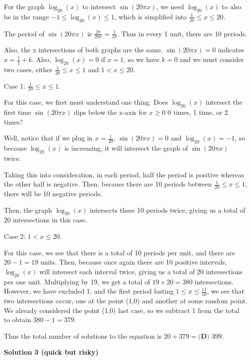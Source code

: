 \begin{enumerate}
 For the graph $\log_{20}(x)$ to intersect $\sin(20\pi x)$, we need $\log_{20}(x)$ to also be in the range $-1 \le \log_{20}(x) \le 1$, which is simplified into $\frac{1}{20} \le x \le 20$.

 The period of $\sin(20\pi x)$ is $\frac{2\pi}{20\pi} = \frac{1}{10}$. Thus in every 1 unit, there are 10 periods.

 Also, the x intersections of both graphs are the same. $\sin(20\pi x) = 0$ indicates $x = \frac{1}{2} + k$. Also, $\log_{20}(x) = 0$ if $x = 1$, so we have $k = 0$ and we must consider two cases, either $\frac{1}{20} \le x \le 1$ and $1 < x \le 20$.

 Case 1: $\frac{1}{20} \le x \le 1$.

 For this case, we first must understand one thing. Does $\log_{20}(x)$ intersect the first time $\sin(20\pi x)$ dips below the x-axis for $x \ge 0$ 0 times, 1 time, or 2 times?

 Well, notice that if we plug in $x = \frac{1}{20}$, $\sin(20\pi x) = 0$ and $\log_{20}(x) = -1$, so because $\log_{20}(x)$ is increasing, it will intersect the graph of $\sin(20\pi x)$ twice.

 Taking this into consideration, in each period, half the period is positive whereas the other half is negative. Then, because there are 10 periods between $\frac{1}{20} \le x \le 1$, there will be 10 negative periods.

 Then, the graph $\log_{20}(x)$ intersects these 10 periods twice, giving us a total of 20 intersections in this case.

 Case 2: $1 < x \le 20$.

 For this case, we see that there is a total of 10 periods per unit, and there are $20 - 1 = 19$ units. Then, because once again there are 10 positive intervals, $\log_{20}(x)$ will intersect each interval twice, giving us a total of 20 intersections per one unit. Multiplying by 19, we get a total of $19 \times 20 = 380$ intersections. However, we have excluded 1, and the first period lasting $1 \le x \le \frac{11}{10}$, we see that two intersections occur, one at the point (1,0) and another at some random point. We already considered the point (1,0) last case, so we subtract 1 from the total to obtain $380 - 1 = 379$.

 Thus the total number of solutions to the equation is $20 + 379 =$$\boxed{\textbf{(D) } 399}$.

 



\textbf{Solution 3 (quick but risky)}


\end{enumerate}
